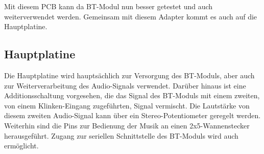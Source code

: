 Mit diesem PCB kann da BT-Modul nun besser getestet und auch weiterverwendet werden.
Gemeinsam mit diesem Adapter kommt es auch auf die Hauptplatine.
\newpage


\subsection*{Hauptplatine} \label{subsec:4.1.8}
Die Hauptplatine wird hauptsächlich zur Versorgung des BT-Moduls, aber auch zur Weiterverarbeitung des Audio-Signals verwendet.
Darüber hinaus ist eine Additionsschaltung vorgesehen, die das Signal des BT-Moduls mit einem zweiten, von einem Klinken-Eingang zugeführten, Signal vermischt.
Die Lautstärke von diesem zweiten Audio-Signal kann über ein Stereo-Potentiometer geregelt werden.
\\
Weiterhin sind die Pins zur Bedienung der Musik an einen 2x5-Wannenstecker herausgeführt.
Zugang zur seriellen Schnittstelle des BT-Moduls wird auch ermöglicht.
\\

